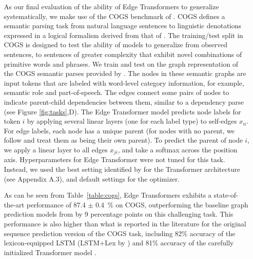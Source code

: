 \documentclass{article}
\begin{document}
As our final evaluation of the ability of Edge Transformers to
generalize systematically, we make use of the COGS benchmark of
\citet{kim_cogs_2020}. COGS defines a semantic parsing task from
natural language sentences to linguistic denotations expressed in a
logical formalism derived from that of \citet[][]{reddy.s:2017}. The
training/test split in COGS is designed to test the ability of models
to generalize from observed sentences, to sentences of greater
complexity that exhibit novel combinations of primitive words and
phrases.  We train and test on the graph
representation of the COGS semantic parses provided by
\citet{ontanon2021making}.
The nodes in these semantic graphs are input tokens that are labeled with word-level category information, for
example, semantic role and part-of-speech. The edges connect some pairs of nodes to indicate
parent-child dependencies between them, similar to a dependency
parse (see Figure \ref{fig:tasks},D). The Edge Transformer model predicts node labels for token $i$
by applying several linear layers (one for each label type) to
self-edges $x_{ii}$. For edge labels, each node has a unique parent
(for nodes with no parent, we follow \citet{ontanon2021making} and
treat them as being their own parent). To predict the parent of node
$i$, we apply a linear layer to all edges $x_{ji}$, and take a softmax
across the position axis.  Hyperparameters for Edge Transformer were
not tuned for this task. Instead, we used the best setting identified by \citet{ontanon2021making} for the Transformer
architecture (see Appendix A.3), and default settings for the optimizer.


As can be seen from Table~\ref{table:cogs}, Edge Transformers exhibits
a state-of-the-art performance of 87.4 $\pm$ 0.4~\% on COGS,
outperforming the baseline graph prediction models from
\citep{ontanon2021making} by 9 percentage
points on this challenging task. This performance is also higher than
what is reported in the literature for the original sequence
prediction version of the COGS task, including 82\% accuracy of the
lexicon-equipped LSTM (LSTM+Lex by \citet{akyurek_learning_2021}) and
81\% accuracy of the carefully initialized Transformer model
\citep{csordas_devil_2021}.
\end{document}
